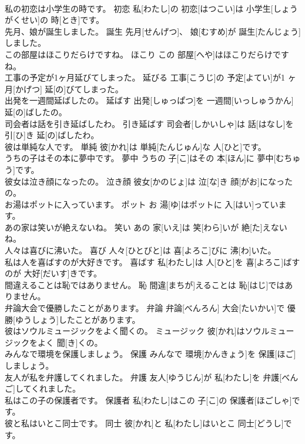 \documentclass[8pt]{extreport}
\begin{document}
\begin{CJK}{UTF8}{min}
\\	私の初恋は小学生の時です。	初恋	私[わたし]の 初恋[はつこい]は 小学生[しょうがくせい]の 時[とき]です。	
\\	先月、娘が誕生しました。	誕生	先月[せんげつ]、 娘[むすめ]が 誕生[たんじょう]しました。	
\\	この部屋はほこりだらけですね。	ほこり	この 部屋[へや]はほこりだらけですね。	
\\	工事の予定が1ヶ月延びてしまった。	延びる	工事[こうじ]の 予定[よてい]が1 ヶ月[かげつ] 延[の]びてしまった。	
\\	出発を一週間延ばしたの。	延ばす	出発[しゅっぱつ]を 一週間[いっしゅうかん] 延[の]ばしたの。	
\\	司会者は話を引き延ばしたわ。	引き延ばす	司会者[しかいしゃ]は 話[はなし]を 引[ひ]き 延[の]ばしたわ。	
\\	彼は単純な人です。	単純	彼[かれ]は 単純[たんじゅん]な 人[ひと]です。	
\\	うちの子はその本に夢中です。	夢中	うちの 子[こ]はその 本[ほん]に 夢中[むちゅう]です。	
\\	彼女は泣き顔になったの。	泣き顔	彼女[かのじょ]は 泣[な]き 顔[がお]になったの。	
\\	お湯はポットに入っています。	ポット	お 湯[ゆ]はポットに 入[はい]っています。	
\\	あの家は笑いが絶えないね。	笑い	あの 家[いえ]は 笑[わら]いが 絶[た]えないね。	
\\	人々は喜びに沸いた。	喜び	人々[ひとびと]は 喜[よろこ]びに 沸[わ]いた。	
\\	私は人を喜ばすのが大好きです。	喜ばす	私[わたし]は 人[ひと]を 喜[よろこ]ばすのが 大好[だいす]きです。	
\\	間違えることは恥ではありません。	恥	間違[まちが]えることは 恥[はじ]ではありません。	
\\	弁論大会で優勝したことがあります。	弁論	弁論[べんろん] 大会[たいかい]で 優勝[ゆうしょう]したことがあります。	
\\	彼はソウルミュージックをよく聞くの。	ミュージック	彼[かれ]はソウルミュージックをよく 聞[き]くの。	
\\	みんなで環境を保護しましょう。	保護	みんなで 環境[かんきょう]を 保護[ほご]しましょう。	
\\	友人が私を弁護してくれました。	弁護	友人[ゆうじん]が 私[わたし]を 弁護[べんご]してくれました。	
\\	私はこの子の保護者です。	保護者	私[わたし]はこの 子[こ]の 保護者[ほごしゃ]です。	
\\	彼と私はいとこ同士です。	同士	彼[かれ]と 私[わたし]はいとこ 同士[どうし]です。	

\end{CJK}
\end{document}
